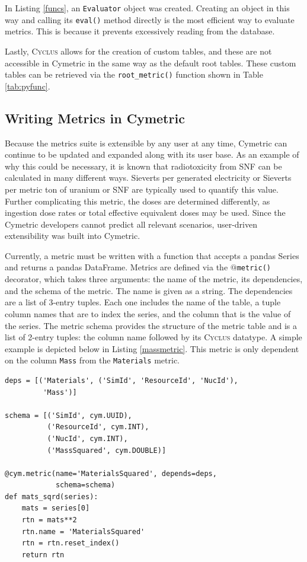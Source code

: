 \documentclass{anstrans}
\newcommand{\cyclus}{\textsc{Cyclus}\xspace}
\newcommand{\code}[1]{{\color{code}\texttt{#1}}}
\begin{document}
In Listing \ref{funcs}, an \code{Evaluator} object was created. 
Creating an object in this way and calling its \code{eval()} method directly 
is the most efficient way to evaluate metrics. This is because
it prevents excessively reading from the database.

Lastly, \cyclus allows for the creation of custom tables, and these are not accessible in 
Cymetric in the same way as the default root tables. 
These custom tables can be retrieved via the \code{root\_metric()} function shown in Table \ref{tab:pyfunc}.

\subsection{Writing Metrics in Cymetric}
Because the metrics suite is extensible by any user at any time, Cymetric
can continue to be updated and expanded along with its user base. 
As an example of why this could be necessary, it is known that radiotoxicity from \gls{SNF} can 
be calculated in many different ways. Sieverts per generated electricity 
or Sieverts per metric ton of uranium or \gls{SNF} are typically used to 
quantify this value. Further complicating this metric, the doses are determined differently, as 
ingestion dose rates or total effective equivalent doses may be used. 
Since the Cymetric developers cannot predict all relevant scenarios, 
user-driven extensibility was built into Cymetric. 

Currently, a metric must be written with a function that accepts a pandas 
Series and returns a pandas DataFrame. Metrics are defined via the
\code{$@$metric()} decorator, which takes three arguments: the name of the 
metric, its dependencies, and the schema of the metric. 
The name is given as a string. The dependencies are a list of 3-entry tuples. 
Each one includes the name of the table, a tuple column names that are to 
index the series, and the column that is the value of the series. 
The metric schema provides the structure of the metric table and is a 
list of 2-entry tuples: the column name followed by its \cyclus datatype. 
A simple example is depicted below in Listing \ref{massmetric}. This metric 
is only dependent on the column \code{Mass} from the \code{Materials} metric. 

\begin{lstlisting}[caption ={Writing a Metric in Cymetric}, label=massmetric]
deps = [('Materials', ('SimId', 'ResourceId', 'NucId'), 
         'Mass')]

schema = [('SimId', cym.UUID), 
          ('ResourceId', cym.INT),
          ('NucId', cym.INT),  
          ('MassSquared', cym.DOUBLE)]

@cym.metric(name='MaterialsSquared', depends=deps, 
            schema=schema)
def mats_sqrd(series):
    mats = series[0]
    rtn = mats**2
    rtn.name = 'MaterialsSquared'
    rtn = rtn.reset_index()
    return rtn
\end{lstlisting}
\end{document}
